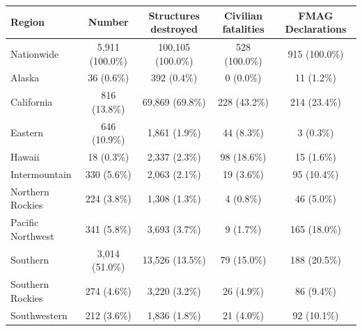 \begin{table}
\fontsize{6.0pt}{7.2pt}\selectfont
\begin{tabular*}{\linewidth}{@{\extracolsep{\fill}}lcccc}
\toprule
Region & Number & Structures destroyed & Civilian fatalities & FMAG Declarations \\ 
\midrule\addlinespace[2.5pt]
Nationwide & 5,911 (100.0\%) & 100,105 (100.0\%) & 528 (100.0\%) & 915 (100.0\%) \\ 
Alaska & 36 (0.6\%) & 392 (0.4\%) & 0 (0.0\%) & 11 (1.2\%) \\ 
California & 816 (13.8\%) & 69,869 (69.8\%) & 228 (43.2\%) & 214 (23.4\%) \\ 
Eastern & 646 (10.9\%) & 1,861 (1.9\%) & 44 (8.3\%) & 3 (0.3\%) \\ 
Hawaii & 18 (0.3\%) & 2,337 (2.3\%) & 98 (18.6\%) & 15 (1.6\%) \\ 
Intermountain & 330 (5.6\%) & 2,063 (2.1\%) & 19 (3.6\%) & 95 (10.4\%) \\ 
Northern Rockies & 224 (3.8\%) & 1,308 (1.3\%) & 4 (0.8\%) & 46 (5.0\%) \\ 
Pacific Northwest & 341 (5.8\%) & 3,693 (3.7\%) & 9 (1.7\%) & 165 (18.0\%) \\ 
Southern & 3,014 (51.0\%) & 13,526 (13.5\%) & 79 (15.0\%) & 188 (20.5\%) \\ 
Southern Rockies & 274 (4.6\%) & 3,220 (3.2\%) & 26 (4.9\%) & 86 (9.4\%) \\ 
Southwestern & 212 (3.6\%) & 1,836 (1.8\%) & 21 (4.0\%) & 92 (10.1\%) \\ 
\bottomrule
\end{tabular*}
\end{table}

